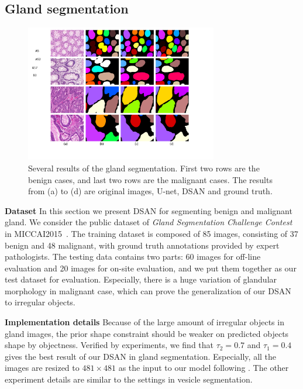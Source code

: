 \subsection{Gland segmentation}
\begin{figure}
    \begin{center}
        \includegraphics[width=3.3in]{figures/FigGland.pdf}
    \end{center}
    \caption{Several results of the gland segmentation.
    First two rows are the benign cases, and last two rows are the malignant cases.
    The results from (a) to (d) are original images, U-net, DSAN and ground truth.}
    \label{FigGland}
\end{figure}
\textbf{Dataset}
In this section we present DSAN for segmenting benign and malignant gland.
We consider the public dataset of \emph{Gland Segmentation Challenge Contest} in MICCAI2015~\cite{Sirinukunwattana2015a}.
The training dataset is composed of 85 images, consisting of 37 benign and 48 malignant, with ground truth annotations provided by expert pathologists.
The testing data contains two parts: 60 images for off-line evaluation and 20 images for on-site evaluation, and we put them together as our test dataset for evaluation.
Especially, there is a huge variation of glandular morphology in malignant case, which can prove the generalization of our DSAN to irregular objects.

\textbf{Implementation details}
Because of the large amount of irregular objects in gland images, the prior shape constraint should be weaker on predicted objects shape by objectness.
Verified by experiments, we find that $\tau_2=0.7$ and $\tau_1=0.4 $ gives the best result of our DSAN in gland segmentation.
Especially, all the images are resized to $481\times 481$ as the input to our model following \cite{Chen2014a}.
The other experiment details are similar to the settings in vesicle segmentation.

